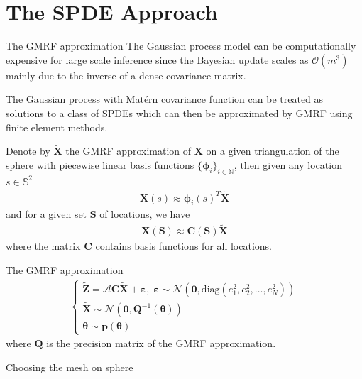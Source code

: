 \documentclass{beamer}
\begin{document}
\section{The SPDE Approach}
\begin{frame}{The GMRF approximation}
The Gaussian process model can be computationally expensive for large scale inference since the Bayesian update scales as $\mathcal{O}(m^3)$ mainly due to the inverse of a dense covariance matrix. 

The Gaussian process with Mat\'{e}rn covariance function can be treated as solutions to a class of SPDEs \citep{Lindgren2011} which can then be approximated by GMRF using finite element methods. 

Denote by $\bm{\tilde{X}}$ the GMRF approximation of $\bm{X}$ on a given triangulation of the sphere with piecewise linear basis functions $\{ \bm{\phi}_i \}_{i \in \mathbb{N}}$, then given any location $s \in \mathbb{S}^2$
\begin{align}
\bm{X}(s) \approx \bm{\phi}_i(s)^T\bm{\tilde{X}}
\end{align}
and for a given set $\bm{S}$ of locations, we have  
\begin{align}
\bm{X}(\bm{S}) \approx \bm{C}(\bm{S})\bm{\tilde{X}}
\end{align}
where the matrix $\bm{C}$ contains basis functions for all locations.


\end{frame}

\begin{frame}{The GMRF approximation}
\begin{align}
\left\{ \begin{array}{l}
\bm{\tilde{Z}} = \bm{\mathcal{A}}\bm{C}\bm{\tilde{X}} + \bm{\varepsilon}, \; 
\bm{\varepsilon} \sim \mathcal{N} (\bm{0}, \mbox{diag}(e_1^2, e_2^2, \dots, e_N^2)) \\
\bm{\tilde{X}} \sim \mathcal{N}(\bm{0}, \bm{Q}^{-1}(\bm{\theta})) \\
\bm{\theta} \sim \bm{p}(\bm{\theta})
\end{array} \right.
\end{align}
where $\bm{Q}$ is the precision matrix of the GMRF approximation.

\end{frame}

\begin{frame}{Choosing the mesh on sphere}

\end{frame}
\end{document}
